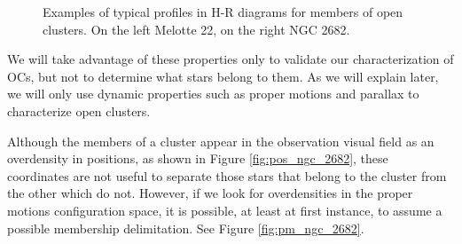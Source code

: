 \documentclass[11pt, a4paper, english]{book}
\begin{document}
\begin{figure}[htbp]
\begin{subfigure}{0.9\textwidth}
\begin{subfigure}[t]{0.45\textwidth}
    \end{subfigure}
  \end{subfigure}
  \caption{Examples of typical profiles in H-R diagrams for members of open clusters. On the left Melotte 22, on the right NGC 2682.}
  \label{fig:examples_of_hr_diagrams}
\end{figure}

We will take advantage of these properties only to validate our characterization of OCs, but not to determine what stars belong to them. As we will explain later,
we will only use dynamic properties such as proper motions and parallax to characterize open clusters.

Although the members of a cluster appear in the observation visual field as an overdensity in positions, as shown in Figure \ref{fig:pos_ngc_2682}, these coordinates
are not useful to separate those stars that belong to the cluster from the other which do not. However, if we look for overdensities in the proper motions configuration space,
it is possible, at least at first instance, to assume a possible membership delimitation. See Figure \ref{fig:pm_ngc_2682}.
\end{document}
